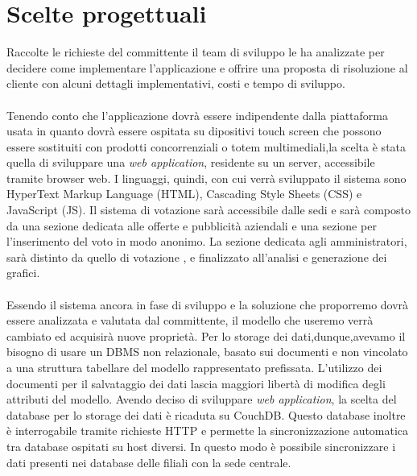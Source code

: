 \newpage
\section{Scelte progettuali}
Raccolte le richieste del committente il team di sviluppo le ha analizzate per
decidere come implementare l'applicazione e offrire una proposta
di risoluzione al cliente con alcuni dettagli implementativi, costi e
tempo di sviluppo.
\\\\
Tenendo conto che l'applicazione dovrà essere indipendente dalla piattaforma
usata in quanto dovrà essere ospitata su dipositivi touch screen che possono
essere sostituiti con prodotti concorrenziali o totem multimediali,la scelta è
stata quella di sviluppare una \emph{web application}, residente su un server,
accessibile tramite browser web. I linguaggi, quindi, con cui verrà sviluppato
il sistema sono HyperText Markup Language (HTML), Cascading Style Sheets (CSS) e
JavaScript (JS). Il sistema di votazione sarà accessibile dalle sedi e sarà
composto da una sezione dedicata alle offerte e pubblicità aziendali e una
sezione per l'inserimento del voto in modo anonimo. La sezione dedicata agli
amministratori, sarà distinto da quello di votazione , e finalizzato all'analisi
e generazione dei grafici.
\\\\
Essendo il sistema ancora in fase di sviluppo e la soluzione che proporremo
dovrà essere analizzata e valutata dal committente, il modello che
useremo verrà cambiato ed acquisirà nuove proprietà. Per lo storage dei
dati,dunque,avevamo il bisogno di usare un DBMS non relazionale, basato
sui documenti e non vincolato a una struttura tabellare del modello
rappresentato prefissata. L'utilizzo dei documenti per il salvataggio dei dati
lascia maggiori libertà di modifica degli attributi del modello. Avendo
deciso di sviluppare \emph{web application}, la scelta del database per lo
storage dei dati è ricaduta su CouchDB. Questo database inoltre è interrogabile
tramite richieste HTTP e permette la sincronizzazione automatica tra database
ospitati su host diversi. In questo modo è possibile sincronizzare i dati
presenti nei database delle filiali con la sede centrale.

